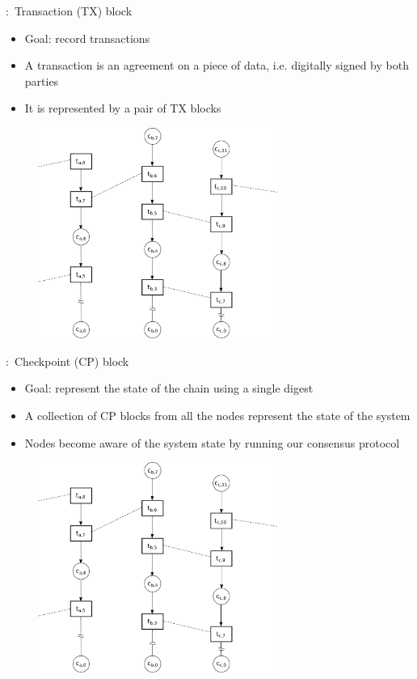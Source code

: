 \documentclass{beamer}
\begin{document}
\begin{frame}{\subsecname:~Transaction (TX) block}
\begin{itemize}
  \item Goal: record transactions
  \item A transaction is an agreement on a piece of data, i.e. digitally signed by both parties
  \item It is represented by a pair of TX blocks
\end{itemize}
\begin{figure}[h]
  \includegraphics[trim={7cm 8.2cm 2cm 2.55cm},clip,width=0.7\textwidth]{trustchain-good-cp}
  \centering
\end{figure}
\end{frame}

\begin{frame}{\subsecname:~Checkpoint (CP) block}
  \begin{itemize}
    \item Goal: represent the state of the chain using a single digest
    \item A collection of CP blocks from all the nodes represent the state of the system
    \item Nodes become aware of the system state by running our consensus protocol
  \end{itemize}
\begin{figure}[h]
  \includegraphics[trim={7cm 2.505cm 2cm 8.55cm},clip,width=0.7\textwidth]{trustchain-good-cp}
  \centering
\end{figure}
\end{frame}
\end{document}
